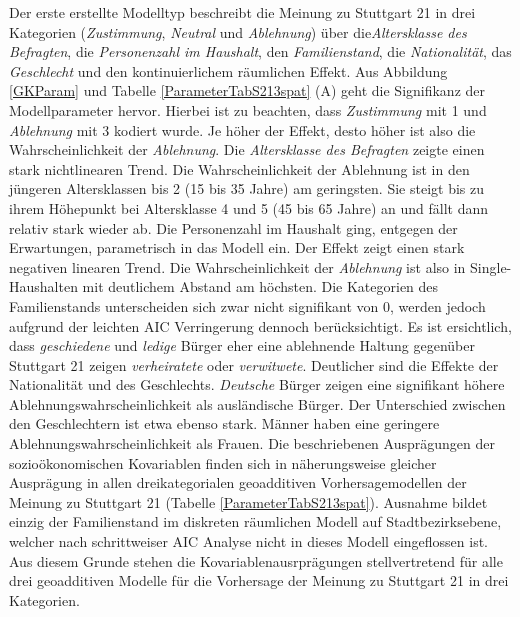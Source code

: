 \documentclass{Vorlage}
\begin{document}
Der erste erstellte Modelltyp beschreibt die Meinung zu Stuttgart 21 in drei Kategorien (\textit{Zustimmung}, \textit{Neutral} und \textit{Ablehnung}) über die\textit{Altersklasse des Befragten}, die \textit{Personenzahl im Haushalt}, den \textit{Familienstand}, die \textit{Nationalität}, das \textit{Geschlecht} und den kontinuierlichem räumlichen Effekt. Aus Abbildung \ref{GKParam} und Tabelle \ref{ParameterTabS213spat} (A) geht die Signifikanz der Modellparameter hervor. Hierbei ist zu beachten, dass \textit{Zustimmung} mit 1 und \textit{Ablehnung} mit 3 kodiert wurde. Je höher der Effekt, desto höher ist also die Wahrscheinlichkeit der \textit{Ablehnung}. Die \textit{Altersklasse des Befragten} zeigte einen stark nichtlinearen Trend. Die Wahrscheinlichkeit der Ablehnung ist in den jüngeren Altersklassen bis 2 (15 bis 35 Jahre) am geringsten. Sie steigt bis zu ihrem Höhepunkt bei Altersklasse  4 und 5 (45 bis 65 Jahre) an und fällt dann relativ stark wieder ab. Die Personenzahl im Haushalt ging, entgegen der Erwartungen, parametrisch in das Modell ein. Der Effekt zeigt einen stark negativen linearen Trend. Die Wahrscheinlichkeit der \textit{Ablehnung} ist also in Single-Haushalten mit deutlichem Abstand am höchsten. Die Kategorien des Familienstands unterscheiden sich zwar nicht signifikant von 0, werden jedoch aufgrund der leichten AIC Verringerung dennoch berücksichtigt. Es ist ersichtlich, dass \textit{geschiedene} und \textit{ledige} Bürger eher eine ablehnende Haltung gegenüber Stuttgart 21 zeigen \textit{verheiratete} oder \textit{verwitwete}. Deutlicher sind die Effekte der Nationalität und des Geschlechts. \textit{Deutsche} Bürger zeigen eine signifikant höhere Ablehnungswahrscheinlichkeit als ausländische Bürger. Der Unterschied zwischen den Geschlechtern ist etwa ebenso stark. Männer haben eine geringere Ablehnungswahrscheinlichkeit als Frauen. Die beschriebenen Ausprägungen der sozioökonomischen Kovariablen finden sich in näherungsweise gleicher Ausprägung in allen dreikategorialen geoadditiven Vorhersagemodellen der Meinung zu Stuttgart 21 (Tabelle \ref{ParameterTabS213spat}). Ausnahme bildet einzig der Familienstand im diskreten räumlichen Modell auf Stadtbezirksebene, welcher nach schrittweiser AIC Analyse nicht in dieses Modell eingeflossen ist. Aus diesem Grunde stehen die Kovariablenausrprägungen stellvertretend für alle drei geoadditiven Modelle für die Vorhersage der Meinung zu Stuttgart 21 in drei Kategorien.\\
\end{document}
